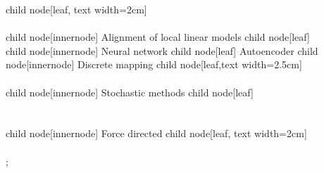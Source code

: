 {{{      child { node[leaf, text width=2cm]{
           \\
           \\
        } } }
    child { node[innernode] {Alignment of local linear models} %
      child { node[leaf]{
           \\
        } } }
    child { node[innernode] {Neural network} %
      child { node[leaf]{
          Autoencoder
        } } }
    child { node[innernode] {Discrete mapping} %
      child { node[leaf,text width=2.5cm]{
           \\
           \\
        } } }
    child { node[innernode] {Stochastic methods} %
      child { node[leaf]{
           \\
           \\
           \\
        } } }
    child { node[innernode] {Force directed} %
      child { node[leaf, text width=2cm]{
           \\            
           \\
        } } } };
}

